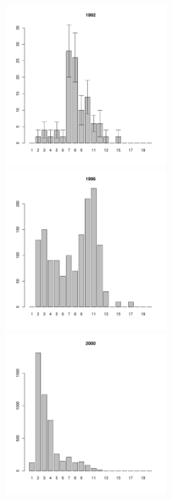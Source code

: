 \begin{figure}[h]

\begin{multicols}{3}
\hfill
\includegraphics[width=60mm]{../White_Sea/Luvenga_Goreliy/middle_1992_.pdf}
\hfill
\includegraphics[width=60mm]{../White_Sea/Luvenga_Goreliy/middle_1996_.pdf}
\hfill
\includegraphics[width=60mm]{../White_Sea/Luvenga_Goreliy/middle_2000_.pdf}
\end{multicols}




\end{figure}

